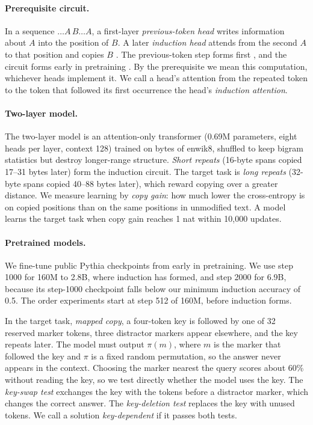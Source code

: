 \paragraph{Prerequisite circuit.}
In a sequence $\ldots A\,B \ldots A$, a first-layer \emph{previous-token head}
writes information about $A$ into the position of $B$. A later \emph{induction head}
attends from the second $A$ to that position and copies $B$
\citep{olsson2022induction}. The previous-token step forms first
\citep{singh2024needs,bietti2023birth,edelman2024evolution}, and the circuit forms
early in pretraining \citep{olsson2022induction,tigges2024consistent}. By the
prerequisite we mean this computation, whichever heads implement it. We call a
head's attention from the repeated token to the token that followed its first
occurrence the head's \emph{induction attention}.

\paragraph{Two-layer model.}
The two-layer model is an attention-only transformer (0.69M parameters, eight heads
per layer, context 128) trained on bytes of enwik8, shuffled to keep bigram
statistics but destroy longer-range structure. \emph{Short repeats} (16-byte spans
copied 17--31 bytes later) form the induction circuit. The target task is
\emph{long repeats} (32-byte spans copied 40--88 bytes later), which reward copying
over a greater distance. We measure learning by \emph{copy gain}: how much lower the
cross-entropy is on copied positions than on the same positions in unmodified text.
A model learns the target task when copy gain reaches 1 nat within 10,000 updates.

\paragraph{Pretrained models.}
We fine-tune public Pythia checkpoints from early in pretraining. We use step 1000
for 160M to 2.8B, where induction has formed, and step 2000 for 6.9B, because its
step-1000 checkpoint falls below our minimum induction accuracy of 0.5. The order
experiments start at step 512 of 160M, before induction forms.

In the target task, \emph{mapped copy}, a four-token key is followed by one of 32
reserved marker tokens, three distractor markers appear elsewhere, and the key
repeats later. The model must output $\pi(m)$, where $m$ is the marker that followed
the key and $\pi$ is a fixed random permutation, so the answer never appears in the
context. Choosing the marker nearest the query scores about 60\% without reading the
key, so we test directly whether the model uses the key. The \emph{key-swap test}
exchanges the key with the tokens before a distractor marker, which changes the
correct answer. The \emph{key-deletion test} replaces the key with unused tokens. We
call a solution \emph{key-dependent} if it passes both tests.

